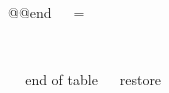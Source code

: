    \csname @@end\expandafter\endcsname
\fi
\lstscanlanguages{}^^A
\def\topfigrule{\hrule\kern-0.4pt\relax}^^A
\let\botfigrule\topfigrule
\belowcaptionskip=\smallskipamount
\begin{table}[tbhp]
\small
\caption{%
         预定义的语言。
请注意，某些定义是初步的，例如HTML和XML。
每个带有下划线的方言是默认方言。}^^A
         \label{uPredefinedLanguages}^^A
\makeatletter
\setbox\@tempboxa\hbox{^^A
   }^^A
   \begin{multicols}{3} %
    \lstprintlanguages\lstlanguages
    \end{multicols}   
\end{table}
^^A
^^A end of table
^^A
\lstset{defaultdialect=[doc]Pascal}^^A restore


